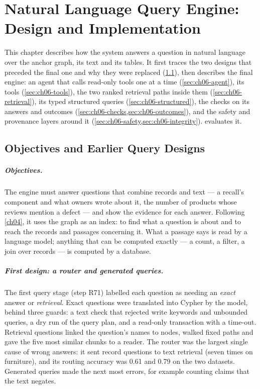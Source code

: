 \chapter{Natural Language Query Engine: Design and Implementation}\label{ch06}

This chapter describes how the system answers a question in natural language over the anchor graph, its text and
its tables. It first traces the two designs that preceded the final one and why they were replaced
(\cref{sec:ch06-history}), then describes the final engine: an agent that calls read-only tools one at a time
(\cref{sec:ch06-agent}), its tools (\cref{sec:ch06-tools}), the two ranked retrieval paths inside them
(\cref{sec:ch06-retrieval}), its typed structured queries (\cref{sec:ch06-structured}), the checks on its answers
and outcomes (\cref{sec:ch06-checks,sec:ch06-outcomes}), and the safety and provenance layers around it
(\cref{sec:ch06-safety,sec:ch06-integrity}).  evaluates it.

\section{Objectives and Earlier Query Designs}\label{sec:ch06-history}

\paragraph{Objectives.} The engine must answer questions that combine records and text --- a recall's component
and what owners wrote about it, the number of products whose reviews mention a defect --- and show the evidence for
each answer. Following \cref{ch04}, it uses the graph as an index: to find what a question is about and to reach
the records and passages concerning it. What a passage says is read by a language model; anything that can be
computed exactly --- a count, a filter, a join over records --- is computed by a database.

\paragraph{First design: a router and generated queries.} The first query stage (step R71) labelled each question
as needing an \emph{exact} answer or \emph{retrieval}. Exact questions were translated into Cypher by the model,
behind three guards: a text check that rejected write keywords and unbounded queries, a dry run of the query
plan, and a read-only transaction with a time-out. Retrieval questions linked the question's names to nodes, walked
fixed paths and gave the five most similar chunks to a reader. The router was the largest single cause of wrong
answers: it sent record questions to text retrieval (seven times on furniture), and its routing accuracy was 0.61
and 0.79 on the two datasets. Generated queries made the next most errors, for example counting claims that the
text negates.

